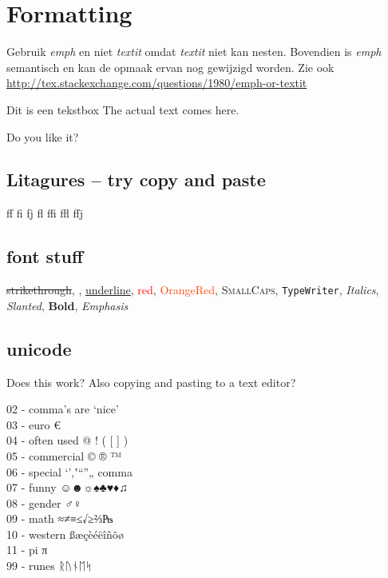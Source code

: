 \lipsum[1-3]

\section{Formatting}

Gebruik \emph{emph} en niet \emph{textit} omdat \emph{textit} niet kan nesten.
Bovendien is \emph{emph} semantisch en kan de opmaak ervan nog gewijzigd worden.
Zie ook \url{http://tex.stackexchange.com/questions/1980/emph-or-textit}

\begin{textbox}{Dit is een tekstbox}
\label{text:somename}
The actual text comes here.

Do you like it?
\end{textbox}

\subsection{Litagures -- try copy and paste}

ff fi fj fl ffi ffl ffj

\subsection{font stuff}

\sout{strikethrough},
,
\underline{underline},
\textcolor{red}{red},
\textcolor{OrangeRed}{OrangeRed},
\textsc{SmallCaps},
\texttt{TypeWriter},
\textit{Italics},
\textsl{Slanted},
\textbf{Bold},
\emph{Emphasis}

\subsection{unicode}

Does this work? Also copying and pasting to a text editor?

02 - comma's are `nice' \\
03 - euro € \\
04 - often used @ ! ( { [ ] } ) ~ \\
05 - commercial © ® ™ \\
06 - special ‘’‚‛“”„ comma \\
07 - funny ☺☻☼♠♣♥♦♫ \\
08 - gender ♂♀ \\
09 - math ≈≠≡≤√≥⅔₧ \\
10 - western ßæçèéëîñõø \\
11 - pi π \\
99 - runes ᚱᚢᚾᛖᛋ

